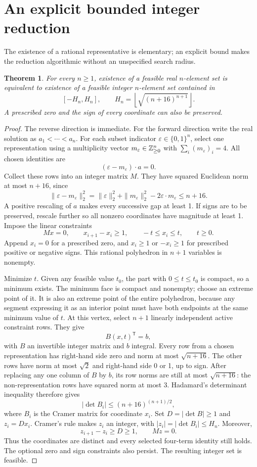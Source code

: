 \documentclass[11pt,a4paper]{article}
\newtheorem{theorem}{Theorem}[section]
\theoremstyle{remark}\newtheorem{remark}[theorem]{Remark}
\begin{document}
\section{An explicit bounded integer reduction}
The existence of a rational representative is elementary; an explicit bound makes the reduction algorithmic without an unspecified search radius.
\begin{theorem}\label{thm:bounded}
For every $n\ge1$, existence of a feasible real $n$-element set is equivalent to existence of a feasible integer $n$-element set contained in
\[[-H_n,H_n],\qquad H_n=\left\lfloor\sqrt{(n+16)^{n+1}}\right\rfloor.\]
A prescribed zero and the sign of every coordinate can also be preserved.
\end{theorem}
\begin{proof}
The reverse direction is immediate. For the forward direction write the real solution as $a_1<\cdots<a_n$. For each subset indicator $\varepsilon\in\{0,1\}^n$, select one representation using a multiplicity vector $m_\varepsilon\in\mathbb Z_{\ge0}^n$ with $\sum_i(m_\varepsilon)_i=4$. All chosen identities are
\[(\varepsilon-m_\varepsilon)\cdot a=0.\]
Collect these rows into an integer matrix $M$. They have squared Euclidean norm at most $n+16$, since
\[\|\varepsilon-m_\varepsilon\|_2^2
 =\|\varepsilon\|_2^2+\|m_\varepsilon\|_2^2-2\varepsilon\cdot m_\varepsilon
 \le n+16.\]
A positive rescaling of $a$ makes every successive gap at least 1. If signs are to be preserved, rescale further so all nonzero coordinates have magnitude at least 1. Impose the linear constraints
\[
 Mx=0,\qquad x_{i+1}-x_i\ge1,\qquad -t\le x_i\le t,\qquad t\ge0.
\]
Append $x_i=0$ for a prescribed zero, and $x_i\ge1$ or $-x_i\ge1$ for prescribed positive or negative signs. This rational polyhedron in $n+1$ variables is nonempty.

Minimize $t$. Given any feasible value $t_0$, the part with $0\le t\le t_0$ is compact, so a minimum exists. The minimum face is compact and nonempty; choose an extreme point of it. It is also an extreme point of the entire polyhedron, because any segment expressing it as an interior point must have both endpoints at the same minimum value of $t$. At this vertex, select $n+1$ linearly independent active constraint rows. They give
\[ B(x,t)^\mathsf T=b,\]
with $B$ an invertible integer matrix and $b$ integral.
Every row from a chosen representation has right-hand side zero and norm at most $\sqrt{n+16}$. The other rows have norm at most $\sqrt2$ and right-hand side 0 or 1, up to sign. After replacing any one column of $B$ by $b$, its row norms are still at most $\sqrt{n+16}$: the non-representation rows have squared norm at most 3. Hadamard's determinant inequality therefore gives
\[|\det B_i|\le(n+16)^{(n+1)/2},\]
where $B_i$ is the Cramer matrix for coordinate $x_i$.
Set $D=|\det B|\ge1$ and $z_i=Dx_i$. Cramer's rule makes $z_i$ an integer, with $|z_i|=|\det B_i|\le H_n$. Moreover,
\[z_{i+1}-z_i\ge D\ge1,\qquad Mz=0.\]
Thus the coordinates are distinct and every selected four-term identity still holds. The optional zero and sign constraints also persist. The resulting integer set is feasible.
\end{proof}
\end{document}
